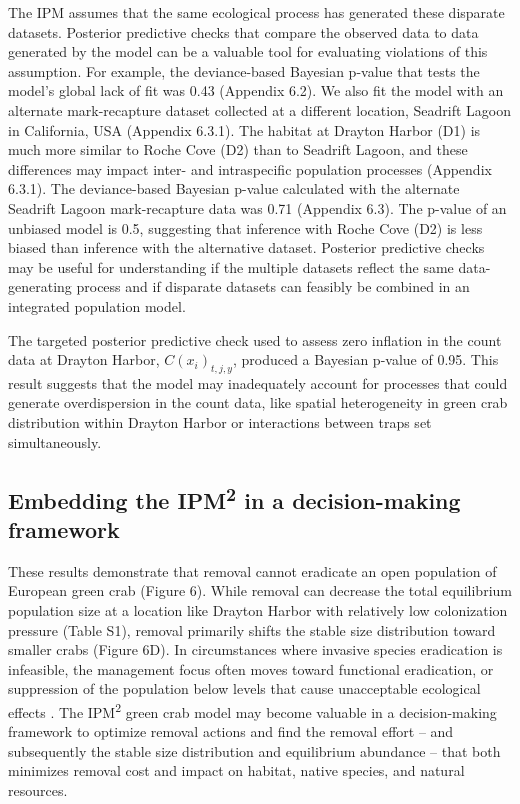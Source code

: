 \documentclass{article}
\begin{document}
The IPM assumes that the same ecological process has generated these disparate datasets. Posterior predictive checks that compare the observed data to data generated by the model can be a valuable tool for evaluating violations of this assumption. For example, the deviance-based Bayesian p-value that tests the model's global lack of fit was 0.43 (Appendix 6.2). We also fit the model with an alternate mark-recapture dataset collected at a different location, Seadrift Lagoon in California, USA (Appendix 6.3.1). The habitat at Drayton Harbor (D1) is much more similar to Roche Cove (D2) than to Seadrift Lagoon, and these differences may impact inter- and intraspecific population processes (Appendix 6.3.1). The deviance-based Bayesian p-value calculated with the alternate Seadrift Lagoon mark-recapture data was 0.71 (Appendix 6.3). The p-value of an unbiased model is 0.5, suggesting that inference with Roche Cove (D2) is less biased than inference with the alternative dataset. Posterior predictive checks may be useful for understanding if the multiple datasets reflect the same data-generating process and if disparate datasets can feasibly be combined in an integrated population model. 

The targeted posterior predictive check used to assess zero inflation in the count data at Drayton Harbor, $C(x_i)_{t,j,y}$, produced a Bayesian p-value of 0.95. This result suggests that the model may inadequately account for processes that could generate overdispersion in the count data, like spatial heterogeneity in green crab distribution within Drayton Harbor or interactions between traps set simultaneously. 

\subsection{Embedding the IPM\textsuperscript{2} in a decision-making framework}

These results demonstrate that removal cannot eradicate an open population of European green crab (Figure 6). While removal can decrease the total equilibrium population size at a location like Drayton Harbor with relatively low colonization pressure (Table S1), removal primarily shifts the stable size distribution toward smaller crabs (Figure 6D). In circumstances where invasive species eradication is infeasible, the management focus often moves toward functional eradication, or suppression of the population below levels that cause unacceptable ecological effects \parencite{green2021functional}. The IPM\textsuperscript{2} green crab model may become valuable in a decision-making framework to optimize removal actions and find the removal effort – and subsequently the stable size distribution and equilibrium abundance – that both minimizes removal cost and impact on habitat, native species, and natural resources. 
\end{document}
